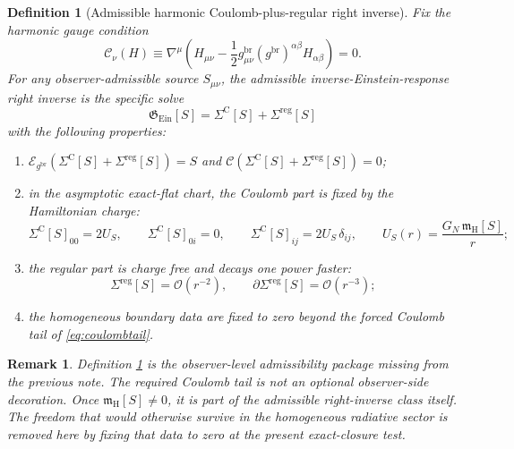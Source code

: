 \documentclass[11pt]{article}
\newcommand{\ReBridge}{g^{\mathrm{br}}}
\newcommand{\SigmaC}{\Sigma^{\mathrm{C}}}
\newcommand{\SigmaReg}{\Sigma^{\mathrm{reg}}}
\newcommand{\EinLin}{\mathcal E_{\ReBridge}}
\newcommand{\EinInv}{\mathfrak G_{\mathrm{Ein}}}
\newcommand{\GaugeH}{\mathcal C}
\newcommand{\HamCharge}{\mathfrak m_{\mathrm H}}
\newtheorem{definition}{Definition}
\newtheorem{remark}{Remark}
\begin{document}
\begin{definition}[Admissible harmonic Coulomb-plus-regular right inverse]
\label{def:inverse}
Fix the harmonic gauge condition
\begin{equation}
\GaugeH_\nu(H)
\equiv
\nabla^\mu
\left(
H_{\mu\nu}
-\frac12 \ReBridge_{\mu\nu}(\ReBridge)^{\alpha\beta}H_{\alpha\beta}
\right)
=0.
\label{eq:gauge}
\end{equation}
For any observer-admissible source \(S_{\mu\nu}\), the \emph{admissible inverse-Einstein-response right inverse} is the specific solve
\begin{equation}
\EinInv[S]=\SigmaC[S]+\SigmaReg[S]
\label{eq:invsplit}
\end{equation}
with the following properties:
\begin{enumerate}
    \item \(\EinLin(\SigmaC[S]+\SigmaReg[S])=S\) and \(\GaugeH(\SigmaC[S]+\SigmaReg[S])=0\);
    \item in the asymptotic exact-flat chart, the Coulomb part is fixed by the Hamiltonian charge:
    \begin{equation}
    \SigmaC[S]_{00}=2U_S,
    \qquad
    \SigmaC[S]_{0i}=0,
    \qquad
    \SigmaC[S]_{ij}=2U_S\,\delta_{ij},
    \qquad
    U_S(r)=\frac{G_N\,\HamCharge[S]}{r};
    \label{eq:coulombtail}
    \end{equation}
    \item the regular part is charge free and decays one power faster:
    \begin{equation}
    \SigmaReg[S]=\mathcal O(r^{-2}),
    \qquad
    \partial\SigmaReg[S]=\mathcal O(r^{-3});
    \label{eq:regular}
    \end{equation}
    \item the homogeneous boundary data are fixed to zero beyond the forced Coulomb tail of \eqref{eq:coulombtail}.
\end{enumerate}
\end{definition}

\begin{remark}
Definition \ref{def:inverse} is the observer-level admissibility package missing from the previous note. The required Coulomb tail is not an optional observer-side decoration. Once \(\HamCharge[S]\neq0\), it is part of the admissible right-inverse class itself. The freedom that would otherwise survive in the homogeneous radiative sector is removed here by fixing that data to zero at the present exact-closure test.
\end{remark}
\end{document}
